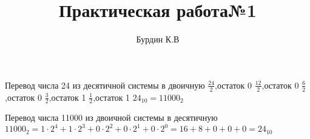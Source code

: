 \documentclass[a4paper,11pt]{article}
\title{Практическая работа№1}
\author{Бурдин К.В}
\begin{document}
\maketitle


Перевод числа 24 из десятичной системы в двоичную
$\frac{24}{2}$,остаток 0
$\frac{12}{2}$,остаток 0
$\frac{6}{2}$,остаток 0
$\frac{3}{2}$,остаток 1
$\frac{1}{2}$,остаток 1
$24_{10}=11000_2$

Перевод числа 11000 из двоичной системы в десятичную
$11000_2=1\cdot2^4+1\cdot2^3+0\cdot2^2+0\cdot2^1+0\cdot2^0=16+8+0+0+0=24_{10}$
\end{document}

